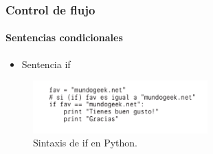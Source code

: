 \begin{frame}[fragile]
  \frametitle{Control de flujo}

    \framesubtitle{Sentencias condicionales}    

  \begin{itemize}
    \item Sentencia if
  \end{itemize}

  \begin{figure}
    \includegraphics[width=0.6\textwidth]{Imagenes/If.jpg}
    \caption{\label{fig:Ejemplo4}Sintaxis de if en Python.}
  \end{figure}

\end{frame}

  
